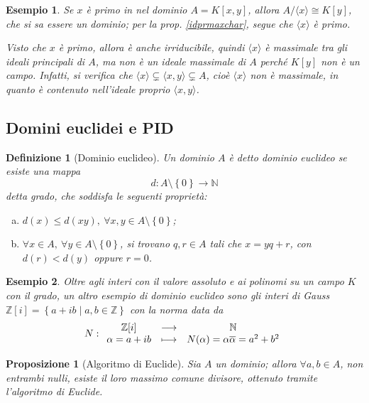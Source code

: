 \documentclass[12pt]{scrartcl}
\theoremstyle{style}
\newtheorem{esempio}{Esempio}[section]
\newtheorem{definizione}{Definizione}[section]
\newtheorem{prop}{Proposizione}[section]
\numberwithin{equation}{subsection}
\begin{document}
\begin{esempio}
	Se $x$ \`e primo in nel dominio $A = K[x,y]$, allora $A / \langle x \rangle\cong K[y]$, che si sa essere un dominio; per la prop. \ref{idprmaxchar}, segue che $\langle x \rangle$ \`e primo.

	Visto che $x$ \`e primo, allora \`e anche irriducibile, quindi $\langle x \rangle$ \`e massimale tra gli ideali principali di $A$, ma non \`e un ideale massimale di $A$ perch\'e $K[y]$ non \`e un campo. 
	Infatti, si verifica che $\langle x  \rangle\subsetneq \langle x,y \rangle \subsetneq A$, cio\`e $\langle x \rangle$ non \`e massimale, in quanto \`e contenuto nell'ideale proprio $\langle x,y \rangle$.
\end{esempio}
\subsection{Domini euclidei e PID}
\begin{definizione}
	[Dominio euclideo]
	Un dominio $A$ \`e detto \textit{dominio euclideo} se esiste una mappa
	\[
	d : A \setminus\left\{ 0 \right\} \longrightarrow \mathbb{N}
	\] 
	detta \textit{grado}, che soddisfa le seguenti propriet\`a:
	\begin{enumerate}[(a).]
		\item $d(x) \le d(xy), \ \forall x,y \in A\setminus\left\{ 0 \right\} $;
		\item $\forall x \in A, \ \forall y \in A\setminus\left\{ 0 \right\} $, si trovano $q,r \in A$ tali che $x = yq + r$, con $d(r)<d(y)$ oppure $r=0$.
	\end{enumerate}
\end{definizione}
\begin{esempio}
	Oltre agli interi con il valore assoluto e ai polinomi su un campo $K$ con il grado, un altro esempio di dominio euclideo sono gli interi di Gauss $\mathbb{Z}[i] = \left\{ a + ib  \mid a,b \in \mathbb{Z} \right\} $ con la norma data da
	\[
	N :
	\begin{array}
		{c c c}
		\mathbb{Z}[i] &\longrightarrow & \mathbb{N}\\
		\alpha = a+ib &\longmapsto & N(\alpha ) = \alpha  \overline{\alpha }=a^2 + b^2
	\end{array}
	\] 
\end{esempio}
\begin{prop}
	[Algoritmo di Euclide]
	Sia $A$ un dominio; allora $\forall a,b \in A$, non entrambi nulli, esiste il loro massimo comune divisore, ottenuto tramite l'algoritmo di Euclide.
\end{prop}
\end{document}
